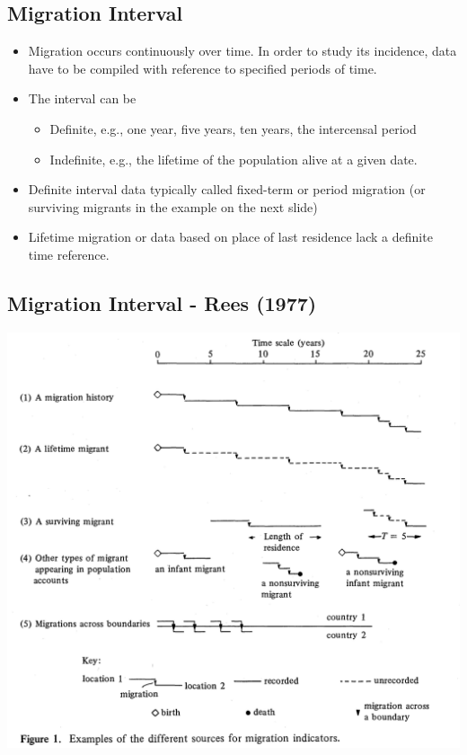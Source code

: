 \documentclass[
]{book}
\providecommand{\tightlist}{%
  \setlength{\itemsep}{0pt}\setlength{\parskip}{0pt}}
\begin{document}
\hypertarget{migration-interval}{%
\subsection{Migration Interval}\label{migration-interval}}

\begin{itemize}
\tightlist
\item
  Migration occurs continuously over time. In order to study its incidence, data have to be compiled
  with reference to specified periods of time.
\item
  The interval can be

  \begin{itemize}
  \tightlist
  \item
    Definite, e.g., one year, five years, ten years, the intercensal period
  \item
    Indefinite, e.g., the lifetime of the population alive at a given date.
  \end{itemize}
\item
  Definite interval data typically called fixed-term or period migration (or surviving migrants in the example on the next slide)
\item
  Lifetime migration or data based on place of last residence lack a definite time reference.
\end{itemize}

\hypertarget{migration-interval---rees-1977}{%
\subsection{Migration Interval - Rees (1977)}\label{migration-interval---rees-1977}}

\includegraphics[width=0.75\linewidth]{img/rees-1977-types}
\end{document}
